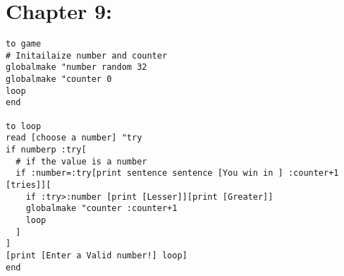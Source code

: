 \section{Chapter 9:}
\begin{verbatim}
to game
# Initailaize number and counter
globalmake "number random 32
globalmake "counter 0
loop
end

to loop
read [choose a number] "try
if numberp :try[
  # if the value is a number 
  if :number=:try[print sentence sentence [You win in ] :counter+1 [tries]][
    if :try>:number [print [Lesser]][print [Greater]]
    globalmake "counter :counter+1
    loop
  ]
]
[print [Enter a Valid number!] loop]
end
\end{verbatim}